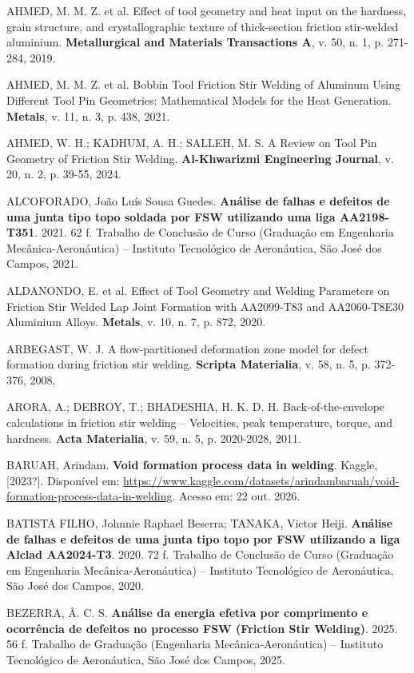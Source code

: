 \documentclass[12pt,openany]{report}
\begin{document}
\begin{singlespace}
\raggedright
\setlength{\parindent}{0pt}
\setlength{\parskip}{\baselineskip}
AHMED, M. M. Z. et al. Effect of tool geometry and heat input on the hardness, grain structure, and crystallographic texture of thick-section friction stir-welded aluminium. \textbf{Metallurgical and Materials Transactions A}, v. 50, n. 1, p. 271-284, 2019.

AHMED, M. M. Z. et al. Bobbin Tool Friction Stir Welding of Aluminum Using Different Tool Pin Geometries: Mathematical Models for the Heat Generation. \textbf{Metals}, v. 11, n. 3, p. 438, 2021.

AHMED, W. H.; KADHUM, A. H.; SALLEH, M. S. A Review on Tool Pin Geometry of Friction Stir Welding. \textbf{Al-Khwarizmi Engineering Journal}, v. 20, n. 2, p. 39-55, 2024.

ALCOFORADO, João Luís Sousa Guedes. \textbf{Análise de falhas e defeitos de uma junta tipo topo soldada por FSW utilizando uma liga AA2198-T351}. 2021. 62 f. Trabalho de Conclusão de Curso (Graduação em Engenharia Mecânica-Aeronáutica) -- Instituto Tecnológico de Aeronáutica, São José dos Campos, 2021.

ALDANONDO, E. et al. Effect of Tool Geometry and Welding Parameters on Friction Stir Welded Lap Joint Formation with AA2099-T83 and AA2060-T8E30 Aluminium Alloys. \textbf{Metals}, v. 10, n. 7, p. 872, 2020.

ARBEGAST, W. J. A flow-partitioned deformation zone model for defect formation during friction stir welding. \textbf{Scripta Materialia}, v. 58, n. 5, p. 372-376, 2008.

ARORA, A.; DEBROY, T.; BHADESHIA, H. K. D. H. Back-of-the-envelope calculations in friction stir welding -- Velocities, peak temperature, torque, and hardness. \textbf{Acta Materialia}, v. 59, n. 5, p. 2020-2028, 2011.

BARUAH, Arindam. \textbf{Void formation process data in welding}. Kaggle, [2023?]. Disponível em: \url{https://www.kaggle.com/datasets/arindambaruah/void-formation-process-data-in-welding}. Acesso em: 22 out. 2026.

BATISTA FILHO, Johnnie Raphael Beserra; TANAKA, Victor Heiji. \textbf{Análise de falhas e defeitos de uma junta tipo topo por FSW utilizando a liga Alclad AA2024-T3}. 2020. 72 f. Trabalho de Conclusão de Curso (Graduação em Engenharia Mecânica-Aeronáutica) -- Instituto Tecnológico de Aeronáutica, São José dos Campos, 2020.

BEZERRA, Â. C. S. \textbf{Análise da energia efetiva por comprimento e ocorrência de defeitos no processo FSW (Friction Stir Welding)}. 2025. 56 f. Trabalho de Graduação (Engenharia Mecânica-Aeronáutica) -- Instituto Tecnológico de Aeronáutica, São José dos Campos, 2025.


\end{singlespace}
\end{document}
